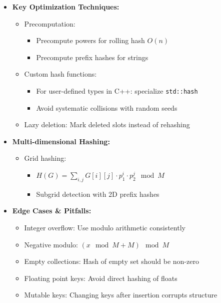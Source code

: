 \documentclass[a4paper,10pt]{book}
\begin{document}
\begin{itemize}
    \item \textbf{Key Optimization Techniques:}
    \begin{itemize}
        \item Precomputation:
        \begin{itemize}
            \item Precompute powers for rolling hash $O(n)$
            \item Precompute prefix hashes for strings
        \end{itemize}
        \item Custom hash functions:
        \begin{itemize}
            \item For user-defined types in C++: specialize \texttt{std::hash}
            \item Avoid systematic collisions with random seeds
        \end{itemize}
        \item Lazy deletion: Mark deleted slots instead of rehashing
    \end{itemize}
    
    \item \textbf{Multi-dimensional Hashing:}
    \begin{itemize}
        \item Grid hashing:
        \begin{itemize}
            \item $H(G) = \sum_{i,j} G[i][j] \cdot p_1^i \cdot p_2^j \mod M$
            \item Subgrid detection with 2D prefix hashes
        \end{itemize}
    \end{itemize}
    
    \item \textbf{Edge Cases \& Pitfalls:}
    \begin{itemize}
        \item Integer overflow: Use modulo arithmetic consistently
        \item Negative modulo: $(x \mod M + M) \mod M$
        \item Empty collections: Hash of empty set should be non-zero
        \item Floating point keys: Avoid direct hashing of floats
        \item Mutable keys: Changing keys after insertion corrupts structure
    \end{itemize}
    

\end{itemize}
\end{document}
